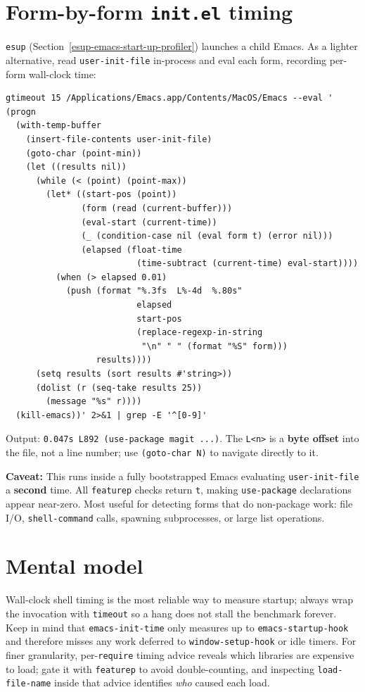 \section{Form-by-form \texttt{init.el} timing}\label{form-by-form-init.el-timing}

\texttt{esup} (Section~\ref{esup-emacs-start-up-profiler}) launches a child Emacs. As a lighter alternative, read \texttt{user-init-file} in-process and eval each form, recording per-form wall-clock time:

\begin{verbatim}
gtimeout 15 /Applications/Emacs.app/Contents/MacOS/Emacs --eval '
(progn
  (with-temp-buffer
    (insert-file-contents user-init-file)
    (goto-char (point-min))
    (let ((results nil))
      (while (< (point) (point-max))
        (let* ((start-pos (point))
               (form (read (current-buffer)))
               (eval-start (current-time))
               (_ (condition-case nil (eval form t) (error nil)))
               (elapsed (float-time
                          (time-subtract (current-time) eval-start))))
          (when (> elapsed 0.01)
            (push (format "%.3fs  L%-4d  %.80s"
                          elapsed
                          start-pos
                          (replace-regexp-in-string
                           "\n" " " (format "%S" form)))
                  results))))
      (setq results (sort results #'string>))
      (dolist (r (seq-take results 25))
        (message "%s" r))))
  (kill-emacs))' 2>&1 | grep -E '^[0-9]'
\end{verbatim}

Output: \texttt{0.047s  L892   (use-package magit ...)}. The \texttt{L<n>} is a \textbf{byte offset} into the file, not a line number; use \texttt{(goto-char N)} to navigate directly to it.

\textbf{Caveat:} This runs inside a fully bootstrapped Emacs evaluating \texttt{user-init-file} a \textbf{second} time. All \texttt{featurep} checks return \texttt{t}, making \texttt{use-package} declarations appear near-zero. Most useful for detecting forms that do non-package work: file I/O, \texttt{shell-command} calls, spawning subprocesses, or large list operations.

\section{Mental model}
Wall-clock shell timing is the most reliable way to measure startup;
always wrap the invocation with \texttt{timeout} so a hang does not
stall the benchmark forever.  Keep in mind that
\texttt{emacs-init-time} only measures up to \texttt{emacs-startup-hook}
and therefore misses any work deferred to \texttt{window-setup-hook} or
idle timers.  For finer granularity, per-\texttt{require} timing advice
reveals which libraries are expensive to load; gate it with
\texttt{featurep} to avoid double-counting, and inspecting
\texttt{load-file-name} inside that advice identifies \emph{who} caused
each load.


